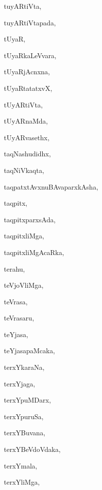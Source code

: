 \begin{multicols}{3}
{\noindent
{tuyARtiVta}, \pageref{tuyARtiVta}

\noindent
{tuyARtiVtapada}, \pageref{tuyARtiVtapada}

\noindent
{tUyaR}, \pageref{tUyaR}

\noindent
{tUyaRkaLeVvara}, \pageref{tUyaRkaLeVvara}

\noindent
{tUyaRjAcnxna}, \pageref{tUyaRjAcnxna}

\noindent
{tUyaRtatatxvX}, \pageref{tUyaRtatatxvX}

\noindent
{tUyARtiVta}, \pageref{tUyARtiVta}

\noindent
{tUyARnaMda}, \pageref{tUyARnaMda}

\noindent
{tUyARvasethx}, \pageref{tUyARvasethx}

\noindent
{taqNashudidhx}, \pageref{taqNashudidhx}

\noindent
{taqNiVkaqta}, \pageref{taqNiVkaqta}

\noindent
{taqpatxtAvxnuBAvaparxkAsha}, \pageref{taqpatxtAvxnuBAvaparxkAsha}

\noindent
{taqpitx}, \pageref{taqpitx}

\noindent
{taqpitxparxsAda}, \pageref{taqpitxparxsAda}

\noindent
{taqpitxliMga}, \pageref{taqpitxliMga}

\noindent
{taqpitxliMgAcaRka}, \pageref{taqpitxliMgAcaRka}

\noindent
{terahu}, \pageref{terahu}

\noindent
{teVjoVliMga}, \pageref{teVjoVliMga}

\noindent
{teVrasa}, \pageref{teVrasa}

\noindent
{teVrasaru}, \pageref{teVrasaru}

\noindent
{teYjasa}, \pageref{teYjasa}

\noindent
{teYjasapaMcaka}, \pageref{teYjasapaMcaka}

\noindent
{terxYkaraNa}, \pageref{terxYkaraNa}

\noindent
{terxYjaga}, \pageref{terxYjaga}

\noindent
{terxYpuMDarx}, \pageref{terxYpuMDarx}

\noindent
{terxYpuruSa}, \pageref{terxYpuruSa}

\noindent
{terxYBuvana}, \pageref{terxYBuvana}

\noindent
{terxYBeVdoVdaka}, \pageref{terxYBeVdoVdaka}

\noindent
{terxYmala}, \pageref{terxYmala}

\noindent
{terxYliMga}, \pageref{terxYliMga2}

}
\end{multicols}
